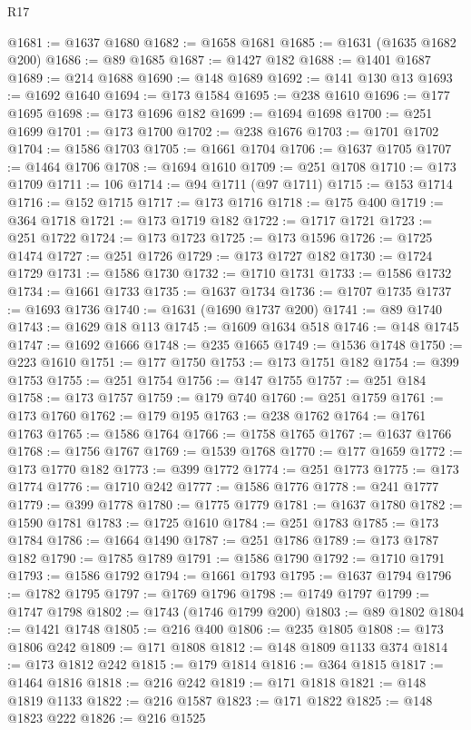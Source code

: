 \begin{lexlean}{R17}
\begin{coremodule}
@1681 := @1637 @1680
@1682 := @1658 @1681
@1685 := @1631 (@1635 @1682 @200)
@1686 := @89 @1685
@1687 := @1427 @182
@1688 := @1401 @1687
@1689 := @214 @1688
@1690 := @148 @1689
@1692 := @141 @130 @13
@1693 := @1692 @1640
@1694 := @173 @1584
@1695 := @238 @1610
@1696 := @177 @1695
@1698 := @173 @1696 @182
@1699 := @1694 @1698
@1700 := @251 @1699
@1701 := @173 @1700
@1702 := @238 @1676
@1703 := @1701 @1702
@1704 := @1586 @1703
@1705 := @1661 @1704
@1706 := @1637 @1705
@1707 := @1464 @1706
@1708 := @1694 @1610
@1709 := @251 @1708
@1710 := @173 @1709
@1711 := 106
@1714 := @94 @1711 (@97 @1711)
@1715 := @153 @1714
@1716 := @152 @1715
@1717 := @173 @1716
@1718 := @175 @400
@1719 := @364 @1718
@1721 := @173 @1719 @182
@1722 := @1717 @1721
@1723 := @251 @1722
@1724 := @173 @1723
@1725 := @173 @1596
@1726 := @1725 @1474
@1727 := @251 @1726
@1729 := @173 @1727 @182
@1730 := @1724 @1729
@1731 := @1586 @1730
@1732 := @1710 @1731
@1733 := @1586 @1732
@1734 := @1661 @1733
@1735 := @1637 @1734
@1736 := @1707 @1735
@1737 := @1693 @1736
@1740 := @1631 (@1690 @1737 @200)
@1741 := @89 @1740
@1743 := @1629 @18 @113
@1745 := @1609 @1634 @518
@1746 := @148 @1745
@1747 := @1692 @1666
@1748 := @235 @1665
@1749 := @1536 @1748
@1750 := @223 @1610
@1751 := @177 @1750
@1753 := @173 @1751 @182
@1754 := @399 @1753
@1755 := @251 @1754
@1756 := @147 @1755
@1757 := @251 @184
@1758 := @173 @1757
@1759 := @179 @740
@1760 := @251 @1759
@1761 := @173 @1760
@1762 := @179 @195
@1763 := @238 @1762
@1764 := @1761 @1763
@1765 := @1586 @1764
@1766 := @1758 @1765
@1767 := @1637 @1766
@1768 := @1756 @1767
@1769 := @1539 @1768
@1770 := @177 @1659
@1772 := @173 @1770 @182
@1773 := @399 @1772
@1774 := @251 @1773
@1775 := @173 @1774
@1776 := @1710 @242
@1777 := @1586 @1776
@1778 := @241 @1777
@1779 := @399 @1778
@1780 := @1775 @1779
@1781 := @1637 @1780
@1782 := @1590 @1781
@1783 := @1725 @1610
@1784 := @251 @1783
@1785 := @173 @1784
@1786 := @1664 @1490
@1787 := @251 @1786
@1789 := @173 @1787 @182
@1790 := @1785 @1789
@1791 := @1586 @1790
@1792 := @1710 @1791
@1793 := @1586 @1792
@1794 := @1661 @1793
@1795 := @1637 @1794
@1796 := @1782 @1795
@1797 := @1769 @1796
@1798 := @1749 @1797
@1799 := @1747 @1798
@1802 := @1743 (@1746 @1799 @200)
@1803 := @89 @1802
@1804 := @1421 @1748
@1805 := @216 @400
@1806 := @235 @1805
@1808 := @173 @1806 @242
@1809 := @171 @1808
@1812 := @148 @1809 @1133 @374
@1814 := @173 @1812 @242
@1815 := @179 @1814
@1816 := @364 @1815
@1817 := @1464 @1816
@1818 := @216 @242
@1819 := @171 @1818
@1821 := @148 @1819 @1133
@1822 := @216 @1587
@1823 := @171 @1822
@1825 := @148 @1823 @222
@1826 := @216 @1525

\end{coremodule}
\end{lexlean}
